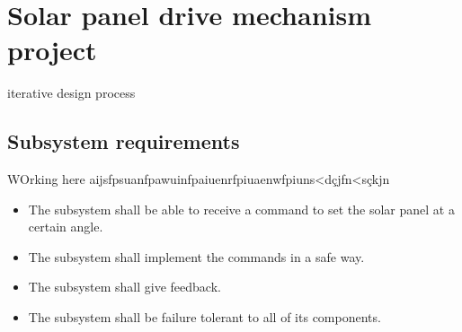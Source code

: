 \section{Solar panel drive mechanism project}

iterative design process



\subsection{Subsystem requirements}


WOrking here aijsfpsuanfpawuinfpaiuenrfpiuaenwfpiuns<dçjfn<sçkjn

\begin{itemize}
    \item The subsystem shall be able to receive a command to set the solar panel at a certain angle.
    \item The subsystem shall implement the commands in a safe way.
    \item The subsystem shall give feedback. 
    \item The subsystem shall be failure tolerant to all of its components.
\end{itemize}